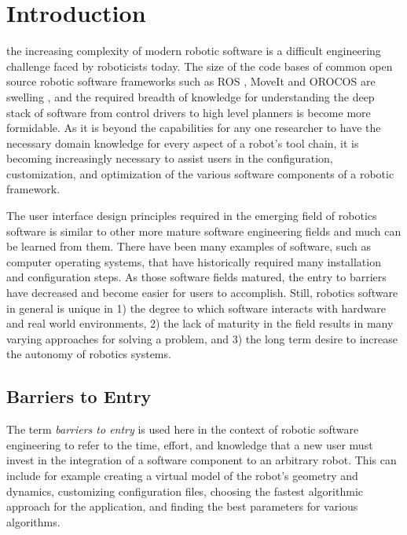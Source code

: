 \documentclass[10pt,journal,compsoc]{joser1}
\begin{document}
\section{Introduction}
 {the increasing complexity of modern robotic software is a difficult engineering challenge faced by roboticists today. The size of the code bases of common open source robotic software frameworks such as ROS \cite{quigley2009ros}, MoveIt \cite{moveit} and OROCOS \cite{bruyninckx2001open} are swelling \cite{makarenko2007benefits}, and the required breadth of knowledge for understanding the deep stack of software from control drivers to high level planners is become more formidable. As it is beyond the capabilities for any one researcher to have the necessary domain knowledge for every aspect of a robot's tool chain, it is becoming increasingly necessary to assist users in the configuration, customization, and optimization of the various software components of a robotic framework. 

The user interface design principles required in the emerging field of robotics software is similar to other more mature software engineering fields and much can be learned from them. There have been many examples of software, such as computer operating systems, that have historically required many installation and configuration steps. As those software fields matured, the entry to barriers have decreased and become easier for users to accomplish. Still, robotics software in general is unique in 1) the degree to which software interacts with hardware and real world environments, 2) the lack of maturity in the field results in many varying approaches for solving a problem, and 3) the long term desire to increase the autonomy of robotics systems. 

\subsection{Barriers to Entry}

The term \textit{barriers to entry} is used here in the context of robotic software engineering to refer to the time, effort, and knowledge that a new user must invest in the integration of a software component to an arbitrary robot. This can include for example creating a virtual model of the robot's geometry and dynamics, customizing configuration files, choosing the fastest algorithmic approach for the application, and finding the best parameters for various algorithms. 

}
\end{document}
